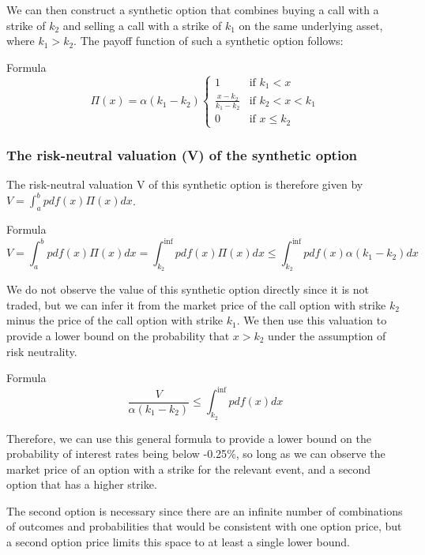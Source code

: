 \documentclass{beamer}
\begin{document}
\begin{frame}
We can then construct a synthetic option that combines buying
a call with a strike of $k_2$ and selling a call with a strike of $k_1$ on the same underlying asset, where $k_1> k_2$. The payoff function of such a synthetic option follows:

\begin{block}{Formula}
    \begin{equation}   
    \Pi(x) =\alpha (k_1-k_2) 
    \begin{cases}
       1 & \text{if $k_1<x$}\\
       \frac{x-k_2}{k_1-k_2} & \text{if $k_2<x<k_1$}\\
       0 & \text{if $x\leq k_2$}
    \end{cases}
    \end{equation}
\end{block}
\end{frame}

\begin{frame}
\frametitle{The risk-neutral valuation (V) of the synthetic option}
The risk-neutral valuation V of this synthetic option is therefore given by $V=\int_a^b pdf(x) \Pi(x) dx$. 
\begin{block}{Formula}
    \begin{equation}   
            V = \int_a^b pdf(x) \Pi(x) dx
           = \int_{k_2}^{\inf} pdf(x) \Pi(x) dx
            \leq \int_{k_2}^{\inf} pdf(x) \alpha(k_1-k_2) dx
 \end{equation}
 \end{block}
We do not observe the value of this synthetic option directly since it is not traded, but we can infer it from the market price of the call option with strike $k_2$ minus the price of the call option with strike $k_1$. We then use this valuation to provide a lower bound on the probability that $x > k_2$  under the assumption of risk neutrality.
\begin{block}{Formula}
   \begin{equation}  
\frac{V}{\alpha(k_1-k_2)} \leq \int_{k_2}^{\inf} pdf(x) dx
    \end{equation}
\end{block}
\end{frame}

\begin{frame}
Therefore, we can use this general formula to provide a lower
bound on the probability of interest rates being below -0.25$\%$, so long as we can observe the market price of an option with a strike for the relevant event, and a second option that has a higher strike.

The second option is necessary since there are an infinite number of combinations of outcomes and probabilities that would be
consistent with one option price, but a second option price limits
this space to at least a single lower bound.
\end{frame}
\end{document}
